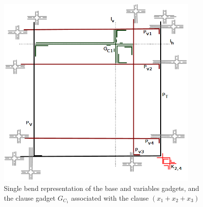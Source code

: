 \begin{figure}[htb]	
\center%
\includegraphics[width=10cm]{./img/formulaCompletaGFonePiePlusLines.png}
\caption{Single bend representation of the base and variables gadgets, and the clause gadget $G_{C_1}$  associated with the clause $(x_1+x_2+x_3)$ }
\label{fig:gadgetOnePie}
\end{figure}